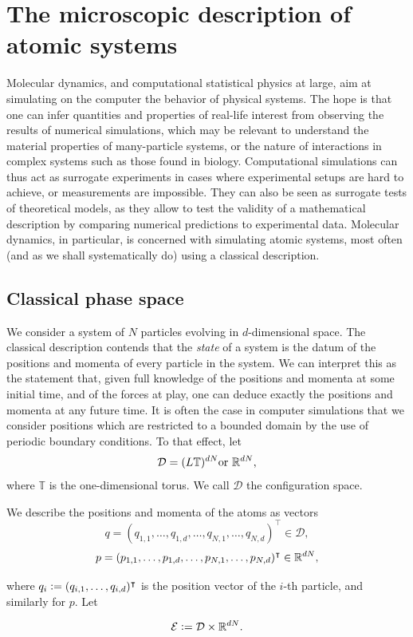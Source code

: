 \section{The microscopic description of atomic systems}
Molecular dynamics, and computational statistical physics at large, aim at simulating on the computer the behavior of physical systems.
The hope is that one can infer quantities and properties of real-life interest from observing the results of numerical simulations, which may be relevant to understand the material properties of many-particle systems, or the nature of interactions in complex systems such as those found in biology.
Computational simulations can thus act as surrogate experiments in cases where experimental setups are hard to achieve, or measurements are impossible.
They can also be seen as surrogate tests of theoretical models, as they allow to test the validity of a mathematical description by comparing numerical predictions to experimental data. Molecular dynamics, in particular, is concerned with simulating atomic systems, most often (and as we shall systematically do) using a classical description.

\subsection{Classical phase space}

We consider a system of $N$ particles evolving in $d$-dimensional space.
The classical description contends that the \textit{state} of a system is the datum of the positions and momenta of every particle in the system.
We can interpret this as the statement that, given full knowledge of the positions and momenta at some initial time, and of the forces at play, one can deduce exactly the positions and momenta at any future time.
It is often the case in computer simulations that we consider positions which are restricted to a bounded domain by the use of periodic boundary conditions. To that effect, let
$$ \mathcal D = (L\mathbb T)^{dN} \text{or } \mathbb{R}^{dN}, $$
where $\mathbb T$ is the one-dimensional torus. We call $\mathcal D$ the configuration space.

\begin{definition}

    We describe the positions and momenta of the atoms as vectors
    $$ q=(q_{1,1},\dots,q_{1,d},\dots ,q_{N,1},\dots,q_{N,d})^\intercal \in \mathcal D,$$
    $$ p=(p_{1,1},\dots,p_{1,d},\dots ,p_{N,1},\dots,p_{N,d})^\intercal \in \mathbb{R}^{dN},$$

    where $q_i \mathrel{\mathop:}= (q_{i,1},\dots, q_{i,d})^\intercal$ is the position vector of the $i$-th particle, and similarly for $p$. Let

    $$\mathcal E \mathrel{\mathop:}= \mathcal D \times \mathbb{R}^{dN}.$$
\end{definition}

